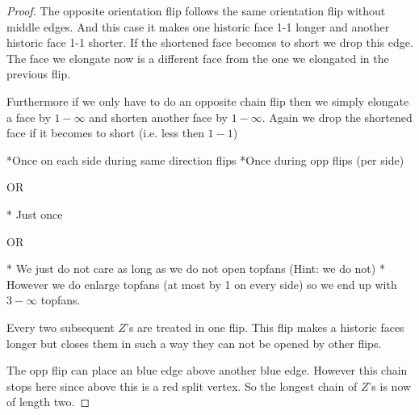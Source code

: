 \begin{proof}
    The opposite orientation flip follows the same orientation flip without middle edges. And this case it makes one historic face 1-1 longer and another historic face 1-1 shorter. If the shortened face becomes to short we drop this edge.
    The face we elongate now is a different face from the one we elongated in the previous flip.

    Furthermore if we only have to do an opposite chain flip then we simply elongate a face by $1-\infty$ and shorten another face by $1-\infty$. Again we drop the shortened face if it becomes to short (i.e. less then $1-1$)

    *Once on each side during same direction flips
    *Once during opp flips (per side)

    OR

    * Just once

    OR

    * We just do not care as long as we do not open topfans (Hint: we do not)
    * However we do enlarge topfans (at most by 1 on every side) so we end up with $3-\infty$ topfans.

    Every two subsequent $Z$'s are treated in one flip. This flip makes a historic faces longer but closes them in such a way they can not be opened by other flips.

    The opp flip can place an blue edge above another blue edge. However this chain stops here since above this is a red split vertex. So the longest chain of $Z$'s is now of length two.
  \end{proof}
